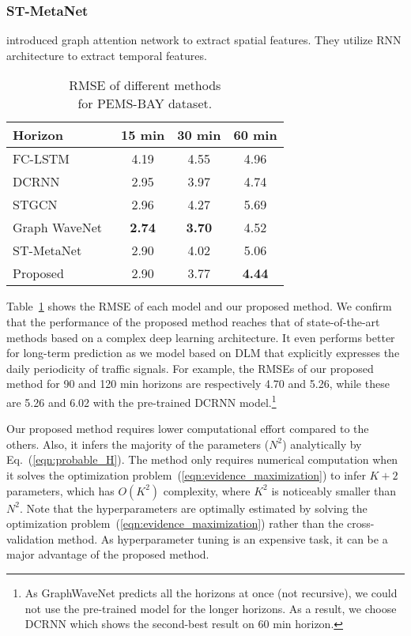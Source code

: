 \documentclass[journal]{IEEEtran}
\begin{document}
\subsubsection{ST-MetaNet}
\textcite{pan2019urban} introduced graph attention network to extract spatial features. They utilize RNN architecture to extract temporal features.


\begin{table}[t!]
\caption{RMSE of different methods\\for PEMS-BAY dataset.}
\label{table:rmse_methods}
\centering
\begin{tabular}{lccc}
\toprule
Horizon &    15 min&    30 min&    60 min\\
\midrule
FC-LSTM~\cite{hochreiter1997long}        &   4.19 &  4.55 &  4.96\\
DCRNN~\cite{li2018diffusion}        &  2.95 &  3.97 &  4.74 \\
STGCN~\cite{yao2018deep}        &  2.96 &  4.27 &  5.69\\
Graph WaveNet~\cite{xu2018graph} &  {\bf{2.74}} &  {\bf{3.70}} &  4.52 \\
ST-MetaNet~\cite{pan2019urban}        &  2.90 &  4.02 &  5.06 \\
Proposed       &  2.90 &  3.77 &  {\bf{4.44}} \\
\bottomrule
\end{tabular}
\end{table}

Table~\ref{table:rmse_methods} shows the RMSE of each model and our proposed method.
We confirm that the performance of the proposed method reaches that of state-of-the-art methods based on a complex deep learning architecture. It even performs better for long-term prediction as we model based on DLM that explicitly expresses the daily periodicity of traffic signals.
For example, the RMSEs of our proposed method for 90 and 120 min horizons are respectively 4.70 and 5.26, while these are 5.26 and 6.02 with the pre-trained DCRNN model.\footnote{As GraphWaveNet predicts all the horizons at once (not recursive), we could not use the pre-trained model for the longer horizons. As a result, we choose DCRNN which shows the second-best result on 60 min horizon.}

Our proposed method requires lower computational effort compared to the others.
Also, it infers the majority of the parameters ($N^2$) analytically by Eq.~(\ref{eqn:probable_H}).
The method only requires numerical computation when it solves the optimization problem~(\ref{eqn:evidence_maximization}) to infer $K+2$ parameters, which has $O(K^2)$ complexity, where $K^2$ is noticeably smaller than $N^2$.
Note that the hyperparameters are optimally estimated by solving the optimization problem~(\ref{eqn:evidence_maximization}) rather than the cross-validation method. As hyperparameter tuning is an expensive task, it can be a major advantage of the proposed method.
\end{document}
